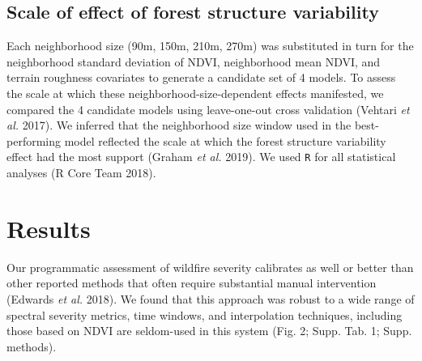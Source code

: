 \documentclass[]{article}
\begin{document}
\hypertarget{scale-of-effect-of-forest-structure-variability}{%
\subsection{Scale of effect of forest structure
variability}\label{scale-of-effect-of-forest-structure-variability}}

Each neighborhood size (90m, 150m, 210m, 270m) was substituted in turn
for the neighborhood standard deviation of NDVI, neighborhood mean NDVI,
and terrain roughness covariates to generate a candidate set of 4
models. To assess the scale at which these neighborhood-size-dependent
effects manifested, we compared the 4 candidate models using
leave-one-out cross validation (Vehtari \emph{et al.} 2017). We inferred
that the neighborhood size window used in the best-performing model
reflected the scale at which the forest structure variability effect had
the most support (Graham \emph{et al.} 2019). We used \texttt{R} for all
statistical analyses (R Core Team 2018).

\hypertarget{results}{%
\section{Results}\label{results}}

Our programmatic assessment of wildfire severity calibrates as well or
better than other reported methods that often require substantial manual
intervention (Edwards \emph{et al.} 2018). We found that this approach
was robust to a wide range of spectral severity metrics, time windows,
and interpolation techniques, including those based on NDVI are
seldom-used in this system (Fig. 2; Supp. Tab. 1; Supp. methods).
\end{document}
